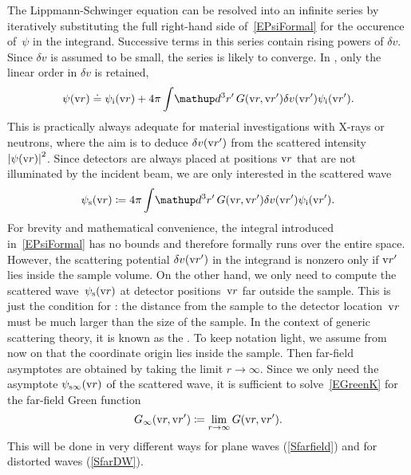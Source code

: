 The Lippmann-Schwinger equation can be resolved into an infinite series
by iteratively substituting the full right-hand side of~\cref{EPsiFormal}
for the occurence of~$\psi$ in the integrand.
Successive terms in this series contain rising powers of $\delta v$.
Since $\delta v$ is assumed to be small, the series is likely to converge.
In ,
only the linear order in $\delta v$ is retained,
\begin{equation}\label{EBorn}
  \psi(\r)
  \doteq \psi_\si(\r)
  + 4\pi \int\!\d^3r'\, G(\r,\r') \delta v(\r') \psi_\si(\r').
\end{equation}
This is practically always adequate for
material investigations with X-rays or neutrons,
where the aim is to
deduce $\delta v(\text{v}{r}')$ from the scattered intensity ${|\psi(\text{v}{r})|}^2$.
Since detectors are always placed at positions $\text{v}{r}$
that are not illuminated by the incident beam,
we are only interested in the scattered wave
%
%
\begin{equation}\label{EBornS}
  \psi_\text{s}(\r)
  \coloneqq
  4\pi \int\!\d^3r'\, G(\r,\r') \delta v(\r') \psi_\si(\r').
\end{equation}
%
%
For brevity and mathematical convenience,
the integral introduced in~\cref{EPsiFormal} has no bounds
and therefore formally runs over the entire space.
However, the scattering potential $\delta v(\text{v}{r}')$ in the integrand is nonzero
only if $\text{v}{r}'$ lies inside the sample volume.
On the other hand, we only need to compute the scattered wave~$\psi_\text{s}(\text{v}{r})$
at detector positions~$\text{v}{r}$ far outside the sample.
This is just the condition for :
%
the distance from the sample to the detector location~$\text{v}{r}$
must be much larger than the size of the sample.
In the context of generic scattering theory,
it is known as the .
%
To keep notation light,
we assume from now on that the coordinate origin
%
%
lies inside the sample.
Then far-field asymptotes are obtained by taking the limit $r\to\infty$.
Since we only need the asymptote $\psi_{\text{s}\infty}(\text{v}{r})$ of the scattered wave,
it is sufficient to solve~\cref{EGreenK} for the far-field Green function
\begin{equation}\label{EGinftydef}
  G_\infty(\text{v}{r},\text{v}{r}')\coloneqq \lim_{r\to\infty} G(\text{v}{r},\text{v}{r}').
\end{equation}
This will be done in very different ways for plane waves (\cref{Sfarfield})
and for distorted waves (\cref{SfarDW}).

